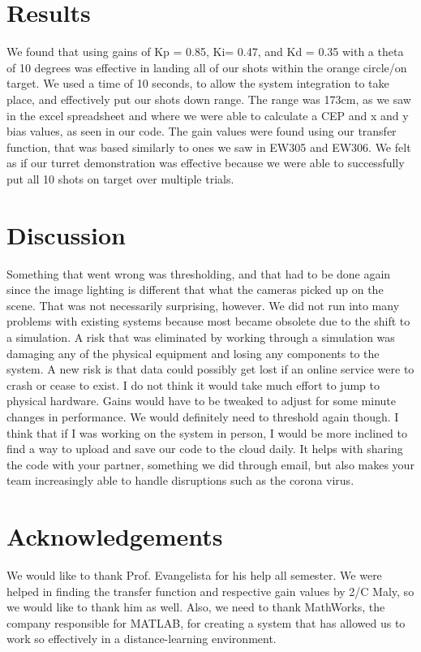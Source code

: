 \documentclass{article}
\begin{document}
\section{Results} We found that using gains of Kp = 0.85, Ki= 0.47, and Kd = 0.35 with a theta of 10 degrees was effective in landing all of our shots within the orange circle/on target. We used a time of 10 seconds, to allow the system integration to take place, and effectively put our shots down range. The range was 173cm, as we saw in the excel spreadsheet and where we were able to calculate a CEP and x and y bias values, as seen in our code. The gain values were found using our transfer function, that was based similarly to ones we saw in EW305 and EW306. 
We felt as if our turret demonstration was effective because we were able to successfully put all 10 shots on target over multiple trials. 
\section{Discussion} Something that went wrong was thresholding, and that had to be done again since the image lighting is different that what the cameras picked up on the scene. That was not necessarily surprising, however. We did not run into many problems with existing systems because most became obsolete due to the shift to a simulation.
A risk that was eliminated by working through a simulation was damaging any of the physical equipment and losing any components to the system. A new risk is that data could possibly get lost if an online service were to crash or cease to exist. I do not think it would take much effort to jump to physical hardware. Gains would have to be tweaked to adjust for some minute changes in performance. We would definitely need to threshold again though.
I think that if I was working on the system in  person, I would be more inclined to find a way to upload and save our code to the cloud daily. It helps with sharing the code with your partner, something we did through email, but also makes your team increasingly able to handle disruptions such as the corona virus.
\section{Acknowledgements}
We would like to thank Prof. Evangelista for his help all semester. We were helped in finding the transfer function and respective gain values by 2/C Maly, so we would like to thank him as well. Also, we need to thank MathWorks, the company responsible for MATLAB, for creating a system that has allowed us to work so effectively in a distance-learning environment. 
\end{document}
